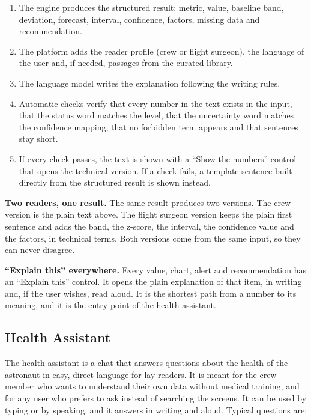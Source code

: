 \begin{enumerate}
\item The engine produces the structured result: metric, value, baseline band, deviation, forecast, interval, confidence, factors, missing data and recommendation.
\item The platform adds the reader profile (crew or flight surgeon), the language of the user and, if needed, passages from the curated library.
\item The language model writes the explanation following the writing rules.
\item Automatic checks verify that every number in the text exists in the input, that the status word matches the level, that the uncertainty word matches the confidence mapping, that no forbidden term appears and that sentences stay short.
\item If every check passes, the text is shown with a ``Show the numbers'' control that opens the technical version. If a check fails, a template sentence built directly from the structured result is shown instead.
\end{enumerate}

\medskip\noindent\textbf{Two readers, one result.} The same result produces two versions. The crew version is the plain text above. The flight surgeon version keeps the plain first sentence and adds the band, the z-score, the interval, the confidence value and the factors, in technical terms. Both versions come from the same input, so they can never disagree.

\medskip\noindent\textbf{``Explain this'' everywhere.} Every value, chart, alert and recommendation has an ``Explain this'' control. It opens the plain explanation of that item, in writing and, if the user wishes, read aloud. It is the shortest path from a number to its meaning, and it is the entry point of the health assistant.

\subsection{Health Assistant}
\label{subsec:assistant}

The health assistant is a chat that answers questions about the health of the astronaut in easy, direct language for lay readers. It is meant for the crew member who wants to understand their own data without medical training, and for any user who prefers to ask instead of searching the screens. It can be used by typing or by speaking, and it answers in writing and aloud. Typical questions are:

